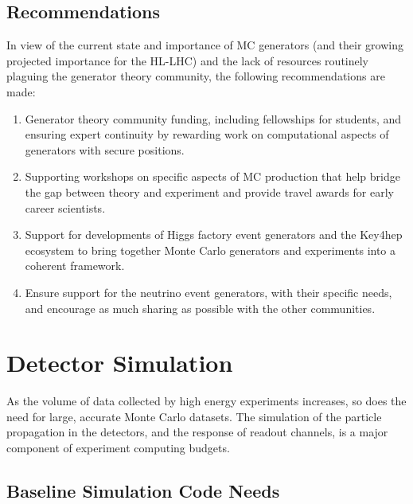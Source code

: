 \documentclass[10pt,a4paper]{article}
\begin{document}
\subsection{Recommendations}\label{recommendations}

In view of the current state and importance of MC generators (and their
growing projected importance for the HL-LHC) and the lack of resources
routinely plaguing the generator theory community, the following
recommendations are made:

\begin{enumerate}
\def\labelenumi{\arabic{enumi}.}
\item
  Generator theory community funding, including fellowships for students, and
  ensuring expert continuity by rewarding work on computational aspects of
  generators with secure positions.
\item
  Supporting workshops on specific aspects of MC production that help bridge the
  gap between theory and experiment and provide travel awards for early career
  scientists.
\item
  Support for developments of Higgs factory event generators and the
  Key4hep ecosystem to bring together Monte Carlo generators and
  experiments into a coherent framework.
\item
  Ensure support for the neutrino event generators, with their specific
  needs, and encourage as much sharing as possible with the other
  communities.
\end{enumerate}

\section{Detector Simulation}\label{detector-simulation}

As the volume of data collected by high energy experiments increases, so
does the need for large, accurate Monte Carlo datasets. The simulation
of the particle propagation in the detectors, and the response of readout
channels, is a major component of experiment computing budgets.

\subsection{Baseline Simulation Code
Needs}\label{baseline-simulation-code-needs}
\end{document}
